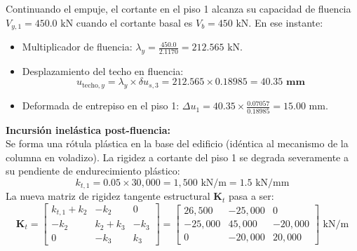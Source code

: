 \documentclass[11pt,letterpaper]{article}
\begin{document}
\begin{examplebox}
Continuando el empuje, el cortante en el piso 1 alcanza su capacidad de fluencia $V_{y,1} = 450.0\text{ kN}$ cuando el cortante basal es $V_b = 450\text{ kN}$. En ese instante:
\begin{itemize}
    \item Multiplicador de fluencia: $\lambda_y = \frac{450.0}{2.1170} = 212.565\text{ kN}$.
    \item Desplazamiento del techo en fluencia:
    \begin{equation}
        u_{\text{techo},y} = \lambda_y \times \delta u_{s,3} = 212.565 \times 0.18985 = \mathbf{40.35\text{ mm}}
    \end{equation}
    \item Deformada de entrepiso en el piso 1: $\Delta u_1 = 40.35 \times \frac{0.07057}{0.18985} = 15.00\text{ mm}$.
\end{itemize}

\textbf{Incursión inelástica post-fluencia:}\\
Se forma una rótula plástica en la base del edificio (idéntica al mecanismo de la columna en voladizo). La rigidez a cortante del piso 1 se degrada severamente a su pendiente de endurecimiento plástico:
\begin{equation}
    k_{t,1} = 0.05 \times 30,000 = 1,500\text{ kN/m} = 1.5\text{ kN/mm}
\end{equation}
La nueva matriz de rigidez tangente estructural $\mathbf{K}_t$ pasa a ser:
\begin{equation}
    \mathbf{K}_t = \begin{bmatrix}
        k_{t,1} + k_2 & -k_2 & 0 \\
        -k_2 & k_2 + k_3 & -k_3 \\
        0 & -k_3 & k_3
    \end{bmatrix} =
    \begin{bmatrix}
        26,500 & -25,000 & 0 \\
        -25,000 & 45,000 & -20,000 \\
        0 & -20,000 & 20,000
    \end{bmatrix} \text{ kN/m}
\end{equation}


\end{examplebox}
\end{document}
